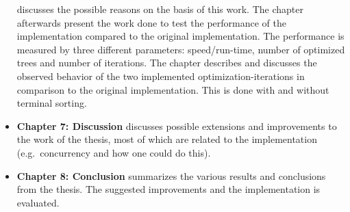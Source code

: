 \begin{itemize}
  discusses the possible reasons on the basis of this work. The chapter
  afterwards present the work done to test the performance of the implementation
  compared to the original implementation. The performance is measured by three
  different parameters: speed/run-time, number of optimized trees and number of
  iterations. The chapter describes and discusses the observed behavior of the
  two implemented optimization-iterations in comparison to the original
  implementation. This is done with and without terminal sorting.
\item \textbf{Chapter 7: Discussion} \quad discusses possible
  extensions and improvements to the work of the thesis, most of which are
  related to the implementation (e.g.\ concurrency and how one could do this).
\item \textbf{Chapter 8: Conclusion} \quad summarizes the various
  results and conclusions from the thesis. The suggested improvements and the
  implementation is evaluated.
\end{itemize}

